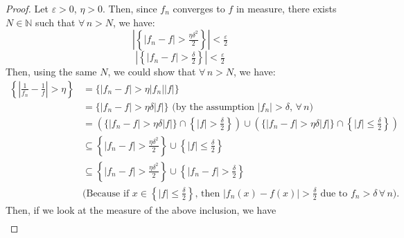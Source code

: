 \begin{answer}
    \begin{proof}
        Let $\varepsilon > 0$, $\eta > 0$. Then, since $f_n$ converges to $f$ in measure, there exists $N \in \mathbb{N}$ such that $\forall \, n>N$, we have:
        \begin{equation}\label{eqn:eqn7}
            \left\lvert \left\{\lvert f_n -f \rvert > \tfrac{\eta \delta^2}{2}\right\}\right\rvert < \tfrac{\varepsilon}{2}
        \end{equation}
        \begin{equation}\label{eqn:eqn8}
            \left\lvert \left\{\lvert f_n-f\rvert > \tfrac{\delta}{2}\right\} \right\rvert < \tfrac{\varepsilon}{2}
        \end{equation}
        Then, using the same $N$, we could show that $\forall \, n > N$, we have:
        \begin{equation}
            \begin{aligned}
                \left\{\left\lvert\tfrac{1}{f_n} - \tfrac{1}{f}\right\rvert > \eta \right\} &= \{\lvert f_n - f\rvert > \eta \lvert f_n \rvert \lvert f \rvert\}\\
                &=\{\lvert f_n - f\rvert > \eta \delta \lvert f \rvert\} \text{ (by the assumption $\lvert f_n \rvert >\delta,\, \forall \, n$)}\\
                &= \left(\{\lvert f_n - f\rvert > \eta \delta \lvert f \rvert\}\cap \left\{\left\lvert f \right\rvert > \tfrac{\delta}{2}\right\}\right) \cup \left(\{\lvert f_n - f\rvert > \eta \delta \lvert f \rvert\}\cap \left\{\left\lvert f \right\rvert \leq \tfrac{\delta}{2}\right\}\right)\\
                & \subseteq \left\{\lvert f_n -f \rvert > \tfrac{\eta\delta^2}{2}\right\} \cup \left\{\lvert f \rvert \leq \tfrac{\delta}{2}\right\}\\
                & \subseteq \left\{\lvert f_n -f \rvert > \tfrac{\eta\delta^2}{2}\right\} \cup \left\{\lvert f_n - f \rvert > \tfrac{\delta}{2}\right\}\\
                &\text{(Because if $x \in \left\{\lvert f \rvert \leq \tfrac{\delta}{2}\right\}$, then $\lvert f_n(x) - f(x) \rvert > \tfrac{\delta}{2}$ due to $f_n > \delta \,\forall \, n$).}
            \end{aligned}
        \end{equation}
        Then, if we look at the measure of the above inclusion, we have
        \begin{equation}
            \begin{aligned}

\end{aligned}
\end{equation}
\end{proof}
\end{answer}
